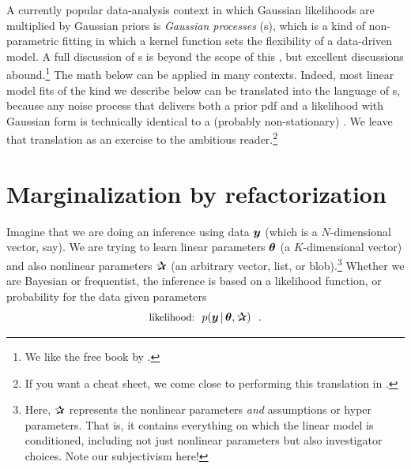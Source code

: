 A currently popular data-analysis context in which Gaussian likelihoods are
multiplied by Gaussian priors is \textsl{Gaussian processes} (s),
which is a kind of
non-parametric fitting in which a kernel function sets the flexibility of a
data-driven model. A full discussion of s is beyond the scope of this
\documentname, but excellent discussions abound.\footnote{We like the free
  book by \cite{Rasmussen:2005}.}
The math below can be applied in many  contexts.
Indeed, most linear model fits of the kind we describe below can be translated
into the language of s, because any noise process that delivers
both a prior pdf and a likelihood with Gaussian form is technically identical
to a (probably non-stationary) .
We leave that translation as an exercise to the ambitious
reader.\footnote{If you want a cheat sheet,
  we come close to performing this translation in \cite{luger}.}


\section{Marginalization by refactorization}

Imagine that we are doing an inference using data $\boldsymbol{y}$ (which is a
$N$-dimensional vector, say).
We are trying to learn linear parameters $\boldsymbol{\theta}$ (a $K$-dimensional vector)
and also nonlinear parameters $\bP$ (an arbitrary vector, list, or
blob).\footnote{Here, $\bP$ represents the nonlinear parameters \emph{and}
  assumptions or hyper parameters. That is, it contains everything on which
  the linear model is conditioned, including not just nonlinear parameters
  but also investigator choices. Note our subjectivism here!}
Whether we are Bayesian or frequentist, the inference is based on
a likelihood function, or probability for the data given parameters
\begin{equation}
\mbox{\small likelihood:} \hquad p(\vy\given\vtheta,\bP) \hquad.
\end{equation}


